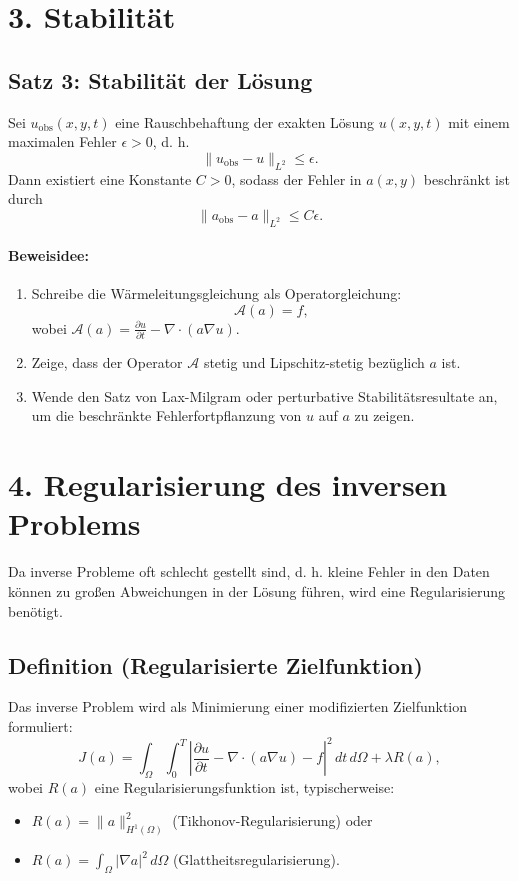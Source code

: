 \section*{3. Stabilität}

\subsection*{Satz 3: Stabilität der Lösung}

Sei $u_{\text{obs}}(x,y,t)$ eine Rauschbehaftung der exakten Lösung $u(x,y,t)$ mit einem maximalen Fehler $\epsilon > 0$, d. h.
\[
\| u_{\text{obs}} - u \|_{L^2} \leq \epsilon.
\]
Dann existiert eine Konstante $C > 0$, sodass der Fehler in $a(x,y)$ beschränkt ist durch
\[
\| a_{\text{obs}} - a \|_{L^2} \leq C \epsilon.
\]

\paragraph{Beweisidee:}
\begin{enumerate}
	\item Schreibe die Wärmeleitungsgleichung als Operatorgleichung:
	\[
	\mathcal{A}(a) = f,
	\]
	wobei $\mathcal{A}(a) = \frac{\partial u}{\partial t} - \nabla \cdot (a \nabla u)$.
	\item Zeige, dass der Operator $\mathcal{A}$ stetig und Lipschitz-stetig bezüglich $a$ ist.
	\item Wende den Satz von Lax-Milgram oder perturbative Stabilitätsresultate an, um die beschränkte Fehlerfortpflanzung von $u$ auf $a$ zu zeigen.
\end{enumerate}

\section*{4. Regularisierung des inversen Problems}

Da inverse Probleme oft schlecht gestellt sind, d. h. kleine Fehler in den Daten können zu großen Abweichungen in der Lösung führen, wird eine Regularisierung benötigt.

\subsection*{Definition (Regularisierte Zielfunktion)}

Das inverse Problem wird als Minimierung einer modifizierten Zielfunktion formuliert:
\[
J(a) = \int_{\Omega} \int_0^T \left| \frac{\partial u}{\partial t} - \nabla \cdot (a \nabla u) - f \right|^2 \, dt \, d\Omega + \lambda R(a),
\]
wobei $R(a)$ eine Regularisierungsfunktion ist, typischerweise:
\begin{itemize}
	\item $R(a) = \| a \|_{H^1(\Omega)}^2$ (Tikhonov-Regularisierung) oder
	\item $R(a) = \int_{\Omega} |\nabla a|^2 \, d\Omega$ (Glattheitsregularisierung).
\end{itemize}

